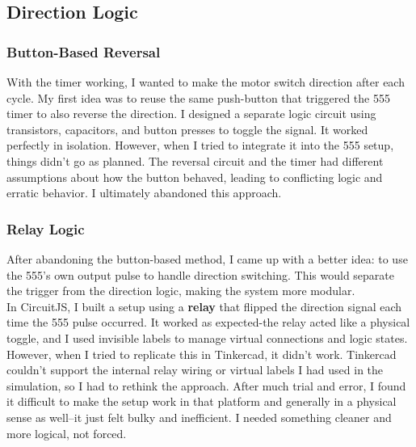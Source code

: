 \documentclass{article}
\begin{document}
\subsection{Direction Logic}
\subsubsection{Button-Based Reversal}
With the timer working, I wanted to make the motor {switch direction} after each cycle. My first idea was to {reuse the same push-button} that triggered the 555 timer to also reverse the direction. I designed a separate logic circuit using transistors, capacitors, and button presses to toggle the signal. It worked perfectly in isolation. However, when I tried to integrate it into the 555 setup, things didn’t go as planned. The reversal circuit and the timer had different assumptions about how the button behaved, leading to conflicting logic and erratic behavior. I ultimately abandoned this approach.

\subsubsection{Relay Logic}
After abandoning the button-based method, I came up with a better idea: to use the {555’s own output pulse} to handle direction switching. This would separate the trigger from the direction logic, making the system more modular.\\[8pt]
In {CircuitJS}, I built a setup using a \textbf{relay} that flipped the direction signal each time the 555 pulse occurred. It worked as expected-the relay acted like a physical toggle, and I used invisible labels to manage virtual connections and logic states.\\[8pt]
However, when I tried to replicate this in {Tinkercad}, it didn’t work. Tinkercad couldn’t support the internal relay wiring or virtual labels I had used in the simulation, so I had to rethink the approach. After much trial and error, I found it difficult to make the setup work in that platform and generally in a physical sense as well--it just felt bulky and inefficient. I needed something cleaner and more logical, not forced.
\end{document}

